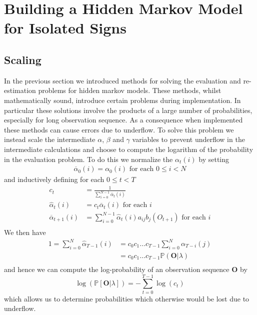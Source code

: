 \chapter{Building a Hidden Markov Model for Isolated Signs}
\ifpdf
    \graphicspath{{Chapter2/Chapter2Figs/PNG/}{Chapter2/Chapter2Figs/PDF/}{Chapter2/Chapter2Figs/}}
\else
    \graphicspath{{Chapter2/Chapter2Figs/EPS/}{Chapter2/Chapter2Figs/}}
\fi

\section{Scaling}
In the previous section we introduced methods for solving the evaluation and re-estimation problems for hidden markov models. These methods, whilst mathematically sound, introduce certain problems during implementation. In particular these solutions involve the products of a large number of probabilities, especially for long observation sequence. As a consequence when implemented these methods can cause errors due to underflow. To solve this problem we instead scale the intermediate $\alpha$, $\beta$ and $\gamma$ variables to prevent underflow in the intermediate calculations and choose to compute the logarithm of the probability in the evaluation problem. To do this we normalize the $\alpha_t(i)$ by setting
\begin{align*}
\overline{\alpha}_0(i) = \alpha_0(i) \text{ for each $0\leq i<N$} 
\end{align*}
and inductively defining for each $0\leq t < T$
\begin{align*}
c_t &= \frac{1}{\sum_{i=0}^{N-1}\overline{\alpha}_t(i)}\\
\hat{\alpha}_t(i) &= c_t\overline{\alpha}_t(i)\text{ for each $i$}\\
\overline{\alpha}_{t+1}(i) &= \sum_{i=0}^{N-1}\hat{\alpha}_t(i)a_{ij}b_j(O_{t+1}) \text{ for each $i$}\\
\end{align*}
We then have
\begin{align*}
1 = \sum_{i=0}^{N}\hat{\alpha}_{T-1}(i) &= c_0c_1\dots c_{T-1}\sum_{i=0}^{N}\alpha_{T-i}(j)\\
&=c_0c_1\dots c_{T-1}\mathbb{P}(\mathbf{O}|\lambda)\\
\end{align*}
and hence we can compute the log-probability of an observation sequence $\mathbf{O}$ by
\begin{equation*}
\log(\mathbb{P}[\mathbf{O}|\lambda]) = -\sum_{t=0}^{T-1}\log(c_t)
\end{equation*}
which allows us to determine probabilities which otherwise would be lost due to underflow. 

